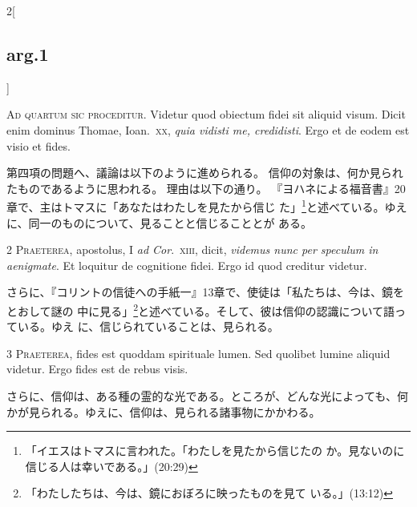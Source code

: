 \documentclass[paper=a4paper,fontsize=10pt,jafontsize=9pt,titlepage]{jlreq}
\begin{document}
\begin{paracol}{2}[\subsection{arg.1}]

{\huge A}{\scshape d quartum sic proceditur}. Videtur quod obiectum
fidei sit aliquid visum. Dicit enim dominus Thomae, Ioan.~{\scshape xx},
{\itshape quia vidisti me, credidisti}. Ergo et de eodem est visio et
fides.

\switchcolumn

第四項の問題へ、議論は以下のように進められる。
信仰の対象は、何か見られたものであるように思われる。
理由は以下の通り。
『ヨハネによる福音書』20章で、主はトマスに「あなたはわたしを見たから信じ
 た」\footnote{「イエスはトマスに言われた。「わたしを見たから信じたの
 か。見ないのに信じる人は幸いである。」(20:29)}と述べている。ゆえに、同一のものについて、見ることと信じることとが
 ある。


{\scshape 2 Praeterea}, apostolus, I {\itshape ad Cor}.~{\scshape xiii},
dicit, {\itshape videmus nunc per speculum in aenigmate}. Et loquitur de
cognitione fidei. Ergo id quod creditur videtur.

\switchcolumn

さらに、『コリントの信徒への手紙一』13章で、使徒は「私たちは、今は、鏡をとおして謎の
 中に見る」\footnote{「わたしたちは、今は、鏡におぼろに映ったものを見て
 いる。」(13:12)}と述べている。そして、彼は信仰の認識について語っている。ゆえ
 に、信じられていることは、見られる。


{\scshape 3 Praeterea}, fides est quoddam spirituale lumen. Sed quolibet
lumine aliquid videtur. Ergo fides est de rebus visis.

\switchcolumn

さらに、信仰は、ある種の霊的な光である。ところが、どんな光によっても、何
 かが見られる。ゆえに、信仰は、見られる諸事物にかかわる。



\end{paracol}
\end{document}
